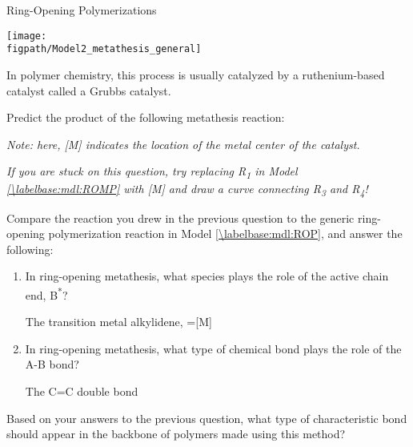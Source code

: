 \begin{activity}{Ring-Opening Polymerizations}
\begin{model}
	\centerline{\texttt{[image: \\figpath/Model2\_metathesis\_general]}}
	
	In polymer chemistry, this process is usually catalyzed by a ruthenium-based catalyst called a Grubbs catalyst.
	
\end{model}

\begin{ctqs}
	
	\question Predict the product of the following metathesis reaction: \label{\labelbase:ctq:metathesis1}
	
		\begin{solution}[1in]\end{solution}
		
		\emph{Note: here, [M] indicates the location of the metal center of the catalyst.}
		
		\emph{If you are stuck on this question, try replacing R\textsubscript{1} in Model \ref{\labelbase:mdl:ROMP} with [M] and draw a curve connecting R\textsubscript{3} and R\textsubscript{4}!}
		
	\question Compare the reaction you drew in the previous question to the generic ring-opening polymerization reaction in Model \ref{\labelbase:mdl:ROP}, and answer the following:
	
		\begin{enumerate}
			\item In ring-opening metathesis, what species plays the role of the active chain end, B\textsuperscript{*}?
			
				\begin{solution}[0.5in]
					The transition metal alkylidene, =[M]
				\end{solution}
				
			\item In ring-opening metathesis, what type of chemical bond plays the role of the A-B bond?
			
				\begin{solution}[0.5in]
					The C=C double bond
				\end{solution}
				
		\end{enumerate}
		
	\question Based on your answers to the previous question, what type of characteristic bond should appear in the backbone of polymers made using this method?
			

\end{ctqs}
\end{activity}
